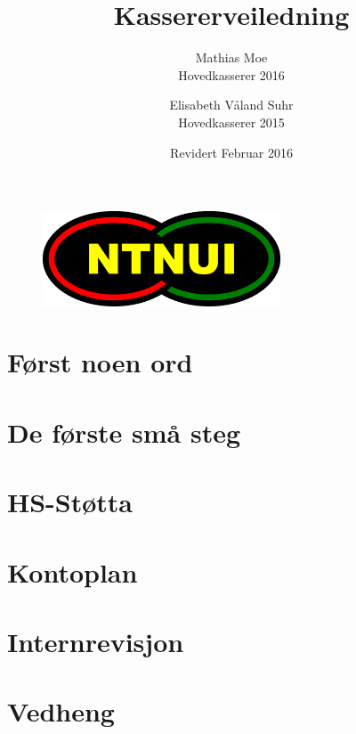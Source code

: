 \documentclass[draft]{article}
\title{\huge Kassererveiledning}
\date{Revidert Februar 2016}
\author{Mathias Moe \\ Hovedkasserer 2016
		\and Elisabeth Våland Suhr \\ Hovedkasserer 2015}
\begin{document}
	\begin{figure}
		\centering
		\includegraphics[keepaspectratio=true, width=200pt]{bildr/logo}
	\end{figure}
\maketitle

\tableofcontents
\newpage


\section*{Først noen ord}
    

\section{De første små steg}
    

\newpage
\section{HS-Støtta}
    
    
\newpage
    

\newpage

\section{Kontoplan}
    

\newpage
\section{Internrevisjon}


\newpage
\section{Vedheng}
	
\end{document}
